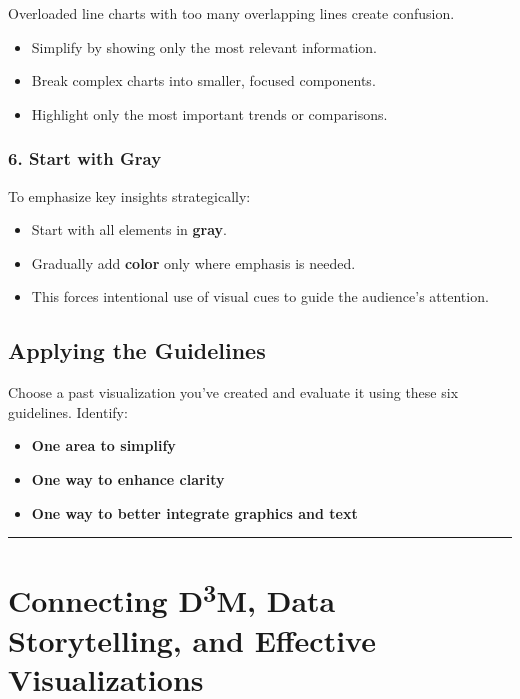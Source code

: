 \documentclass[
  11pt,
]{article}
\providecommand{\tightlist}{%
  \setlength{\itemsep}{0pt}\setlength{\parskip}{0pt}}
\begin{document}
Overloaded line charts with too many overlapping lines create confusion.

\begin{itemize}
\tightlist
\item
  Simplify by showing only the most relevant information.
\item
  Break complex charts into smaller, focused components.
\item
  Highlight only the most important trends or comparisons.
\end{itemize}

\subsubsection{\texorpdfstring{\textbf{6. Start with
Gray}}{6. Start with Gray}}\label{start-with-gray}

To emphasize key insights strategically:

\begin{itemize}
\tightlist
\item
  Start with all elements in \textbf{gray}.
\item
  Gradually add \textbf{color} only where emphasis is needed.
\item
  This forces intentional use of visual cues to guide the audience's
  attention.
\end{itemize}

\subsection{\texorpdfstring{\textbf{Applying the
Guidelines}}{Applying the Guidelines}}\label{applying-the-guidelines}

Choose a past visualization you've created and evaluate it using these
six guidelines. Identify:

\begin{itemize}
\tightlist
\item
  \textbf{One area to simplify}
\item
  \textbf{One way to enhance clarity}
\item
  \textbf{One way to better integrate graphics and text}
\end{itemize}

\begin{center}\rule{0.5\linewidth}{0.5pt}\end{center}

\section{\texorpdfstring{Connecting D\textsuperscript{3}M, Data
Storytelling, and Effective
Visualizations}{Connecting D3M, Data Storytelling, and Effective Visualizations}}\label{connecting-d3m-data-storytelling-and-effective-visualizations}
\end{document}

